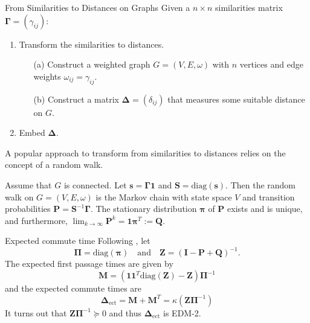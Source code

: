 \documentclass[professionalfonts,hyperref={pdfpagelabels=false,colorlinks=true,linkcolor=red}]{beamer}
\begin{document}
\begin{frame}{From Similarities to Distances on Graphs}
  Given a $n \times n$ similarities matrix $\bm{\Gamma} = (\gamma_{ij})$:
  \begin{enumerate}
  \item Transform the similarities to distances.
    \begin{enumerate}
    \item[(a)]Construct a weighted graph $G = (V,E,\omega)$ with $n$
      vertices and edge weights $\omega_{ij} = \gamma_{ij}$.
    \item[(b)] Construct a matrix $\bm{\Delta} = (\delta_{ij})$
      that measures some suitable distance on $G$. 
    \end{enumerate}
  \item Embed $\bm{\Delta}$. 
  \end{enumerate}
  A popular approach to transform from similarities to
    distances relies on the concept of a \alert{random walk}.
    
    \vskip10pt Assume that $G$ is connected. Let $\bm{s} =
    \bm{\Gamma}\bm{1}$ and $\mathbf{S} = \mathrm{diag}(\bm{s})$. Then
    the random walk on $G = (V,E,\omega)$ is the Markov chain with
    state space $V$ and transition probabilities $\mathbf{P} =
    \mathbf{S}^{-1}\bm{\Gamma}$. The stationary distribution
    $\bm{\pi}$ of $\mathbf{P}$ exists and is unique, and furthermore,
    $\lim_{k \rightarrow \infty} \mathbf{P}^{k} = \bm{1}\bm{\pi}^{T}
    := \mathbf{Q}$.
\end{frame}

\begin{frame}{Expected commute time}
  Following \cite{kemeny83:_finit_markov_chain}, let
  \begin{equation*}
    \bm{\Pi} = \mathrm{diag}(\bm{\pi}) \quad \text{and} \quad
    \mathbf{Z} = (\mathbf{I} - \mathbf{P} + \mathbf{Q})^{-1}.
  \end{equation*}
  The expected first passage times are given by
  \begin{equation*}
    \mathbf{M} = (\mathbf{1}\mathbf{1}^{T}\mathrm{diag}(\mathbf{Z}) -
    \mathbf{Z})\bm{\Pi}^{-1} 
  \end{equation*}
  and the expected commute times are
  \begin{equation*}
    \bm{\Delta}_{\mathrm{ect}} = \mathbf{M} + \mathbf{M}^{T} =
    \kappa(\mathbf{Z}\bm{\Pi}^{-1})
  \end{equation*}
  It turns out that $\mathbf{Z}\bm{\Pi}^{-1} \succeq 0$ and thus
  $\bm{\Delta}_{\mathrm{ect}}$ is EDM-2.
\end{frame}
\end{document}
